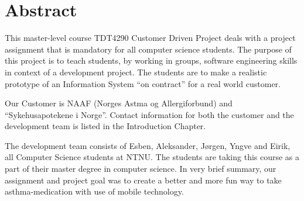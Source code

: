 \section{Abstract}

This master-level course TDT4290 Customer Driven Project deals with a project assignment that is mandatory for all computer science students. 
The purpose of this project is to teach students, by working in groups, software engineering skills in context of a development project. 
The students are to make a realistic prototype of an Information System “on contract” for a real world customer.

Our Customer is NAAF (Norges Astma og Allergiforbund) and ``Sykehusapotekene i Norge''.  Contact information for both the customer and 
the development team is listed in the Introduction Chapter.  


The development team consists of Esben, Aleksander, Jørgen, Yngve and Eirik, all Computer Science students at NTNU.
The students are taking this course as a part of their master degree in computer science.
In very brief summary, our assignment and project goal was to create a better and more fun way to take asthma-medication with use of
mobile technology. 
